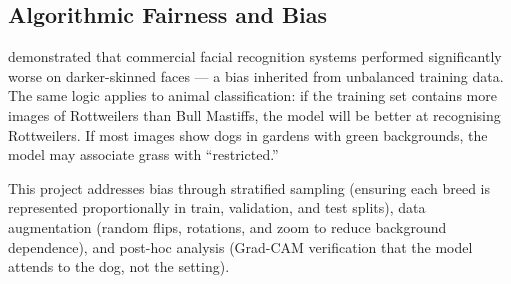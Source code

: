 \subsection{Algorithmic Fairness and Bias}

\citet{buolamwini2018gender} demonstrated that commercial facial recognition systems performed significantly worse on darker-skinned faces --- a bias inherited from unbalanced training data. The same logic applies to animal classification: if the training set contains more images of Rottweilers than Bull Mastiffs, the model will be better at recognising Rottweilers. If most images show dogs in gardens with green backgrounds, the model may associate grass with ``restricted.''

This project addresses bias through stratified sampling (ensuring each breed is represented proportionally in train, validation, and test splits), data augmentation (random flips, rotations, and zoom to reduce background dependence), and post-hoc analysis (Grad-CAM verification that the model attends to the dog, not the setting).

